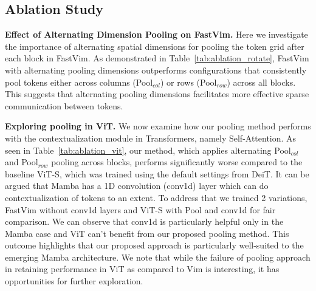\subsection{Ablation Study}
\label{subexp:ablation}

\textbf{Effect of Alternating Dimension Pooling on FastVim.} Here we investigate the importance of alternating spatial dimensions for pooling the token grid after each block in FastVim. As demonstrated in Table~\ref{tab:ablation_rotate}, FastVim with alternating pooling dimensions outperforms configurations that consistently pool tokens either across columns (Pool$_{col}$) or rows (Pool$_{row}$) across all blocks. This suggests that alternating pooling dimensions facilitates more effective sparse communication between tokens. 


\begin{table}[!h]
    \caption{Effect of alternating dimension pooling on ImageNet-1k.} 
    \vspace{-15pt}
    \begin{center}
\end{center}
\vspace{-14pt}
    \label{tab:ablation_rotate}
\end{table}


\noindent \textbf{Exploring pooling in ViT.} We now examine how our pooling method performs with the contextualization module in Transformers, namely Self-Attention. As seen in Table~\ref{tab:ablation_vit}, our method, which applies alternating Pool$_{col}$ and Pool$_{row}$ pooling across blocks, performs significantly worse compared to the baseline ViT-S, which was trained using the default settings from DeiT\cite{deit}. It can be argued that Mamba has a 1D convolution (conv1d) layer which can do contextualization of tokens to an extent. To address that we trained 2 variations, FastVim without conv1d layers and ViT-S with Pool and conv1d for fair comparison. We can observe that conv1d is particularly helpful only in the Mamba case and ViT can't benefit from our proposed pooling method. This outcome highlights that our proposed approach is particularly well-suited to the emerging Mamba architecture. We note that while the failure of pooling approach in retaining performance in ViT as compared to Vim is interesting, it has opportunities for further exploration. 


